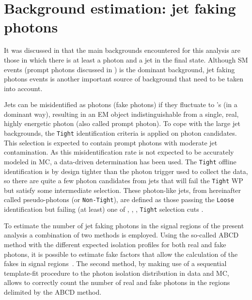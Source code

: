 \section{Background estimation: jet faking photons}
\label{sec:bkg:estimation}

It was discussed in \Ch{\ref{ch:strategy}} that the main backgrounds encountered for this analysis are those in which there is at least a photon and a jet in the final state. Although \ac{SM} \gammajet events (prompt photons discussed in \Sect{\ref{subsec:theory:sm:prompt_photon}}) is the dominant background, jet faking photons events is another important source of background that need to be taken into account.



Jets can be misidentified as photons (fake photons) if they fluctuate to \pizero's (in a dominant way), resulting in an \ac{EM} object indistinguishable from a single, real, highly energetic photon (also called prompt photon). To cope with the large jet backgrounds, the \texttt{Tight} identification criteria is applied on photon candidates. This selection is expected to contain prompt photons with moderate jet contamination. As this misidentification rate is not expected to be accurately modeled in \ac{MC}, a data-driven determination has been used. The \texttt{Tight} offline identification is by design tighter than the photon trigger used to collect the data, so there are quite a few photon candidates from jets that will fail the \texttt{Tight} \ac{WP} but satisfy some intermediate selection. These photon-like jets, from hereinafter called pseudo-photons (or \texttt{Non-Tight}), are defined as those passing the \texttt{Loose} identification but failing (at least) one of \wone, \fside, \deltae, \eratio \texttt{Tight} selection cuts \cite{ATLAS-EGamma-Performance-2015-2017}.

To estimate the number of jet faking photons in the signal regions of the present analysis a combination of two methods is employed. Using the so-called ABCD method with the different expected isolation profiles for both real and fake photons, it is possible to estimate fake factors that allow the calculation of the fakes in signal regions~\cite{ATLAS-SUSY-PhotonMetX-13TeV,ATLAS-SUSY-PhotonMetX-13TeV-NOTE,ATLAS-SUSY-PhotonJetMet-13TeV,ATLAS-SUSY-PhotonJetMet-13TeV-NOTE}. The second method, by making use of a sequential template-fit procedure to the photon isolation distribution in data and \ac{MC}, allows to correctly count the number of real and fake photons in the regions delimited by the ABCD method.

